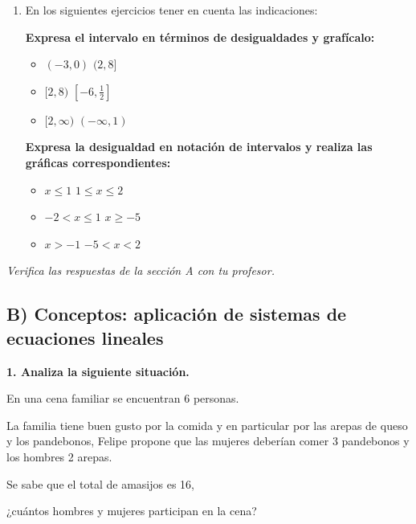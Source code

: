 \documentclass[12pt,a4paper]{article}
\begin{document}
\begin{enumerate}
    \item En los siguientes ejercicios tener en cuenta las indicaciones:

        \textbf{Expresa el intervalo en términos de desigualdades y grafícalo:}

        \begin{itemize}
            \item $(-3, 0)$ \hspace{2cm} $(2, 8]$
            \item $[2, 8)$ \hspace{2cm} $[-6, \frac{1}{2}]$
            \item $[2, \infty)$ \hspace{2cm} $(-\infty, 1)$
        \end{itemize}

        \textbf{Expresa la desigualdad en notación de intervalos y realiza las gráficas correspondientes:}

        \begin{itemize}
            \item $x \leq 1$ \hspace{2cm} $1 \leq x \leq 2$
            \item $-2 < x \leq 1$ \hspace{2cm} $x \geq -5$
            \item $x > -1$ \hspace{2cm} $-5 < x < 2$
        \end{itemize}
\end{enumerate}

\begin{center}
\textit{Verifica las respuestas de la sección A con tu profesor.}
\end{center}

\vspace{1.5cm}

\subsection*{B) Conceptos: aplicación de sistemas de ecuaciones lineales}

\textbf{1. Analiza la siguiente situación.}

\begin{tcolorbox}[colback=fondoazul,colframe=azuloscuro,breakable]

En una cena familiar se encuentran 6 personas.

La familia tiene buen gusto por la comida y en particular por las arepas de queso y los pandebonos, Felipe propone que las mujeres deberían comer 3 pandebonos y los hombres 2 arepas.

Se sabe que el total de amasijos es 16,

¿cuántos hombres y mujeres participan en la cena?

\end{tcolorbox}
\end{document}
